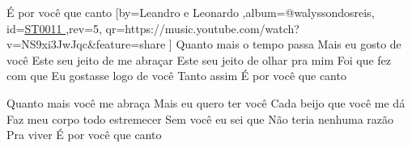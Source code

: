 \beginsong
{É por você que canto %
}[by={Leandro e Leonardo %
},album={@walyssondosreis},
id={\href{https://music.youtube.com/watch?v=NS9xi3JwJqc&feature=share %
}{ST0011 %
}},rev={5}, %
qr={https://music.youtube.com/watch?v=NS9xi3JwJqc&feature=share %
}]
\beginverse 
Quanto mais o tempo passa
Mais eu gosto de você
Este seu jeito de me abraçar
Este seu jeito de olhar pra mim
Foi que fez com que
Eu gostasse logo de você
Tanto assim
É por você que canto
\endverse

\beginverse 
Quanto mais você me abraça
Mais eu quero ter você
Cada beijo que você me dá
Faz meu corpo todo estremecer
Sem você eu sei que
Não teria nenhuma razão
Pra viver
É por você que canto
\endverse


